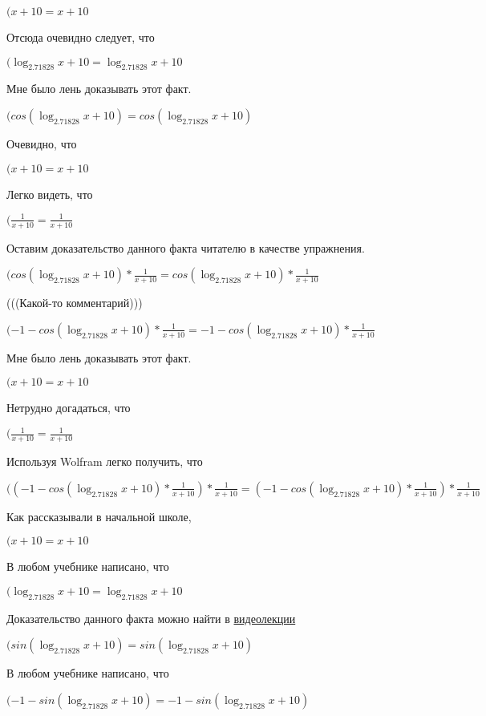\documentclass[12pt,a4paper,fleqn]{article}
\theoremstyle{definition}
\begin{document}
$( x  +  10  =  x  +  10 $

Отсюда очевидно следует, что

$(\log_{ 2.71828 }{ x  +  10 } = \log_{ 2.71828 }{ x  +  10 }$

Мне было лень доказывать этот факт.

$(cos(\log_{ 2.71828 }{ x  +  10 }) = cos(\log_{ 2.71828 }{ x  +  10 })$

Очевидно, что

$( x  +  10  =  x  +  10 $

Легко видеть, что

$(\frac{ 1 }{ x  +  10 }
 = \frac{ 1 }{ x  +  10 }
$

Оставим доказательство данного факта читателю в качестве упражнения.

$(cos(\log_{ 2.71828 }{ x  +  10 }) * \frac{ 1 }{ x  +  10 }
 = cos(\log_{ 2.71828 }{ x  +  10 }) * \frac{ 1 }{ x  +  10 }
$

(((Какой-то комментарий)))

$( -1  - cos(\log_{ 2.71828 }{ x  +  10 }) * \frac{ 1 }{ x  +  10 }
 =  -1  - cos(\log_{ 2.71828 }{ x  +  10 }) * \frac{ 1 }{ x  +  10 }
$

Мне было лень доказывать этот факт.

$( x  +  10  =  x  +  10 $

Нетрудно догадаться, что

$(\frac{ 1 }{ x  +  10 }
 = \frac{ 1 }{ x  +  10 }
$

Используя Wolfram легко получить, что

$(( -1  - cos(\log_{ 2.71828 }{ x  +  10 }) * \frac{ 1 }{ x  +  10 }
) * \frac{ 1 }{ x  +  10 }
 = ( -1  - cos(\log_{ 2.71828 }{ x  +  10 }) * \frac{ 1 }{ x  +  10 }
) * \frac{ 1 }{ x  +  10 }
$

Как рассказывали в начальной школе,

$( x  +  10  =  x  +  10 $

В любом учебнике написано, что

$(\log_{ 2.71828 }{ x  +  10 } = \log_{ 2.71828 }{ x  +  10 }$

Доказательство данного факта можно найти в \href{https://www.youtube.com/watch?v=dQw4w9WgXcQ}{видеолекции}

$(sin(\log_{ 2.71828 }{ x  +  10 }) = sin(\log_{ 2.71828 }{ x  +  10 })$

В любом учебнике написано, что

$( -1  - sin(\log_{ 2.71828 }{ x  +  10 }) =  -1  - sin(\log_{ 2.71828 }{ x  +  10 })$
\end{document}

